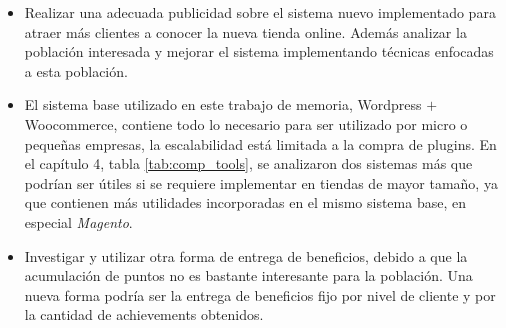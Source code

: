 \begin{itemize}

\item Realizar una adecuada publicidad sobre el sistema nuevo implementado para
	atraer más clientes a conocer la nueva tienda online. Además analizar
	la población interesada y mejorar el sistema implementando técnicas 
	enfocadas a esta población.

\item El sistema base utilizado en este trabajo de memoria, Wordpress $+$ Woocommerce, contiene
todo lo necesario para ser utilizado por micro o pequeñas empresas, la escalabilidad está limitada
a la compra de plugins. En el capítulo 4, tabla \ref{tab:comp_tools}, se analizaron dos sistemas más
que podrían ser útiles si se requiere implementar {\GAM} en tiendas de mayor tamaño, ya que contienen
más utilidades incorporadas en el mismo sistema base, en especial \emph{Magento}.

\item Investigar y utilizar otra forma de entrega de beneficios, debido a que la 
acumulación de puntos no es bastante interesante para la población. Una nueva forma podría ser la entrega 
de beneficios fijo por nivel de cliente y por la cantidad de achievements obtenidos.

\end{itemize}


